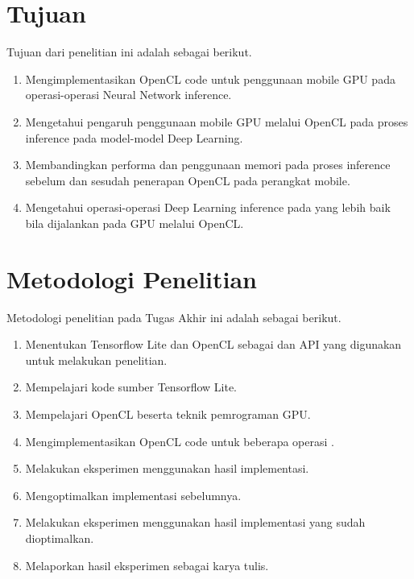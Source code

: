 \section{Tujuan}
Tujuan dari penelitian ini adalah sebagai berikut.
\begin{enumerate}
\item Mengimplementasikan OpenCL code untuk penggunaan mobile GPU pada operasi-operasi Neural Network inference.
\item Mengetahui pengaruh penggunaan mobile GPU melalui OpenCL pada proses inference pada model-model Deep Learning.
\item Membandingkan performa dan penggunaan memori pada proses inference sebelum dan sesudah penerapan OpenCL pada perangkat mobile.
\item Mengetahui operasi-operasi Deep Learning inference pada yang lebih baik bila dijalankan pada GPU melalui OpenCL.

\end{enumerate}



\section{Metodologi Penelitian}
Metodologi penelitian pada Tugas Akhir ini adalah sebagai berikut.
\begin{enumerate}
\item Menentukan Tensorflow Lite dan OpenCL sebagai \framework dan API yang digunakan untuk melakukan penelitian.
\item Mempelajari kode sumber Tensorflow Lite.
\item Mempelajari OpenCL beserta teknik pemrograman GPU.
\item Mengimplementasikan OpenCL code untuk beberapa operasi \deeplearning \inference.
\item Melakukan eksperimen menggunakan hasil implementasi.
\item Mengoptimalkan implementasi sebelumnya.
\item Melakukan eksperimen menggunakan hasil implementasi yang sudah dioptimalkan.
\item Melaporkan hasil eksperimen sebagai karya tulis.
\end{enumerate}

